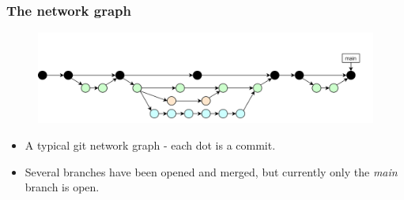 \documentclass[aspectratio=169]{beamer}
\begin{document}
\begin{frame}
	\frametitle{The network graph}

	\vspace{-.5cm}
	\begin{minipage}[t][5cm][t]{\textwidth}
		\begin{figure}
			\centering
			\includegraphics[width=\textwidth]{./img/dime-gitflow-network.png}
		\end{figure}
	\end{minipage}

	\vspace{-.5cm}
	\begin{minipage}[t][5cm][t]{\textwidth}
		\begin{itemize}
			\setlength\itemsep{.5em}
			\item A typical git network graph - each dot is a commit.
			\item Several branches have been opened and merged,
			but currently only the \textit{main} branch is open.
		\end{itemize}
	\end{minipage}

\end{frame}
\end{document}
